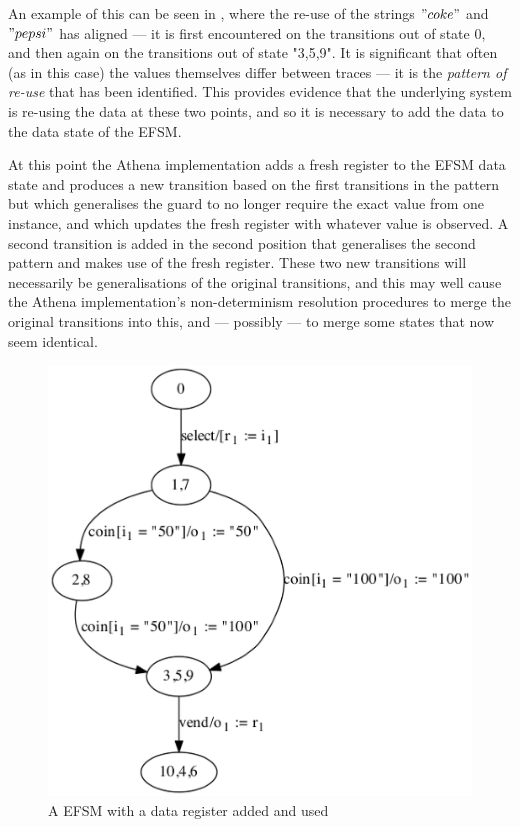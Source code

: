 An example of this can be seen in , where the re-use of the strings $"coke"$ and $"pepsi"$ has aligned --- it is first encountered on the transitions out of state 0, and then again on the transitions out of state "3,5,9". It is significant that often (as in this case) the values themselves differ between traces --- it is the \emph{pattern of re-use} that has been identified. This provides evidence that the underlying system is re-using the data at these two points, and so it is necessary to add the data to the data state of the EFSM. 

At this point the Athena implementation adds a fresh register to the EFSM data state and produces a new transition based on the first transitions in the pattern but which generalises the guard to no longer require the exact value from one instance, and which updates the fresh register with whatever value is observed. A second transition is added in the second position that generalises the second pattern and makes use of the fresh register. These two new transitions will necessarily be generalisations of the original transitions, and this may well cause the Athena implementation's non-determinism resolution procedures to merge the original transitions into this, and --- possibly --- to merge some states that now seem identical.

\begin{figure}[h]
\begin{center}
\includegraphics[width=12cm]{figures/efsm/data.eps}
\caption{A EFSM with a data register added and used}
\label{fig:data}
\end{center}
\end{figure}

